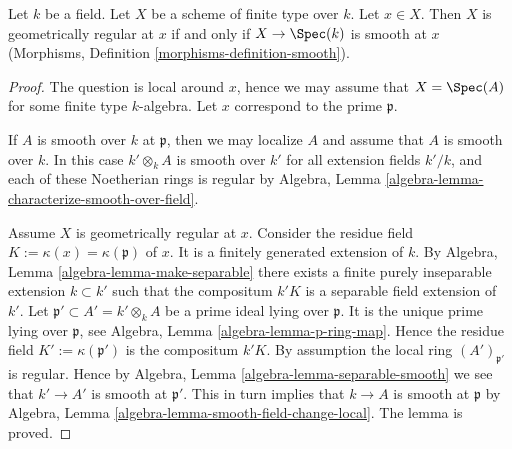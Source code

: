 \begin{lemma}
\label{lemma-geometrically-regular-smooth}
Let $k$ be a field.
Let $X$ be a scheme of finite type over $k$.
Let $x \in X$.
Then $X$ is geometrically regular at $x$ if and only if $X \to \Spec(k)$
is smooth at $x$ (Morphisms, Definition \ref{morphisms-definition-smooth}).
\end{lemma}

\begin{proof}
The question is local around $x$,
hence we may assume that $X = \Spec(A)$
for some finite type $k$-algebra.
Let $x$ correspond to the prime $\mathfrak p$.

\medskip\noindent
If $A$ is smooth over $k$ at $\mathfrak p$, then we may localize $A$
and assume that $A$ is smooth over $k$. In this case $k' \otimes_k A$
is smooth over $k'$ for all extension fields $k'/k$, and each of
these Noetherian rings is regular by
Algebra, Lemma \ref{algebra-lemma-characterize-smooth-over-field}.

\medskip\noindent
Assume $X$ is geometrically regular at $x$.
Consider the residue field $K := \kappa(x) = \kappa(\mathfrak p)$ of $x$.
It is a finitely generated extension of $k$.
By Algebra, Lemma \ref{algebra-lemma-make-separable}
there exists a finite purely inseparable
extension $k \subset k'$ such that the compositum
$k'K$ is a separable field extension of $k'$.
Let $\mathfrak p' \subset A' = k' \otimes_k A$ be a prime ideal
lying over $\mathfrak p$. It is the unique prime lying over $\mathfrak p$, see
Algebra, Lemma \ref{algebra-lemma-p-ring-map}.
Hence the residue field $K' := \kappa(\mathfrak p')$
is the compositum $k'K$. By assumption the local ring
$(A')_{\mathfrak p'}$ is regular. Hence by
Algebra, Lemma \ref{algebra-lemma-separable-smooth}
we see that $k' \to A'$ is smooth at $\mathfrak p'$.
This in turn implies that $k \to A$ is smooth at $\mathfrak p$ by
Algebra, Lemma \ref{algebra-lemma-smooth-field-change-local}.
The lemma is proved.
\end{proof}


